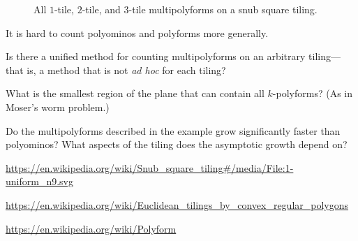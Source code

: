 \documentclass{article}
\begin{document}
\begin{figure}[ht!]
  \caption{
    All $1$-tile, $2$-tile, and $3$-tile multipolyforms on a snub square tiling.
  }
\end{figure}
\begin{note}
  It is hard to count polyominos and polyforms more generally.
\end{note}
\begin{question}
  Is there a unified method for counting multipolyforms on an arbitrary
  tiling---that is, a method that is not \textit{ad hoc} for each tiling?
\end{question}

\begin{related}
  \item What is the smallest region of the plane that can contain all
  $k$-polyforms? (As in Moser's worm problem.)
  \item Do the multipolyforms described in the example grow significantly
  faster than polyominos? What aspects of the tiling does the asymptotic growth
  depend on?
\end{related}
\begin{references}
  \item \url{https://en.wikipedia.org/wiki/Snub_square_tiling#/media/File:1-uniform_n9.svg}
  \item \url{https://en.wikipedia.org/wiki/Euclidean_tilings_by_convex_regular_polygons}
  \item \url{https://en.wikipedia.org/wiki/Polyform}
\end{references}
\end{document}
